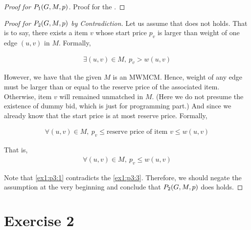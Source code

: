 \documentclass[11pt,a4paper]{article}
\begin{document}
\begin{proof} [Proof for $P_1(G, M, p)$]
    Proof for the .
\end{proof}

\begin{proof} [Proof for $P_2(G, M, p)$ by Contradiction]
    Let us assume that \Ptwo does not holds. That is to say, there exists a
    item $v$ whose start price $p_v$ is larger than weight of one edge
    $(u,v)$ in $M$. Formally, 

    \begin{align} \label{ex1:p3:1}
        \exists (u,v) \in M,\ p_v > w(u,v) 
    \end{align}
    
    However, we have that the given $M$ is an MWMCM.
    Hence, weight of any edge must be larger than or equal to the reserve
    price of the associated item. Otherwise, item $v$ will remained unmatched
    in $M$. (Here we do not presume the existence of dummy bid, which is just
    for programming part.) And since we already know that the start
    price is at most reserve price. Formally,
    
    \begin{align} \label{ex1:p3:2}
        \forall (u,v) \in M,\ p_v \leq \text{reserve price of item } v \leq
        w(u,v)
    \end{align}

    That is,
    \begin{align} \label{ex1:p3:3}
        \forall (u,v) \in M,\ p_v \leq w(u,v)
    \end{align}

    Note that \eqref{ex1:p3:1} contradicts the \eqref{ex1:p3:3}. Therefore, we
    should negate the assumption at the very beginning and conclude that
    $P_2(G, M, p)$ does holds.
\end{proof}

\newpage
\section{Exercise 2}
 \\
\end{document}
